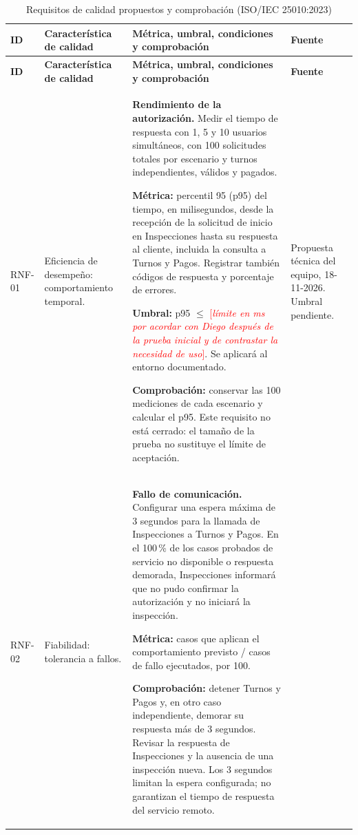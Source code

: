 \documentclass[11pt,a4paper]{article}
\newcommand{\pendiente}[1]{\textcolor{red}{[\textit{#1}]}}
\begin{document}
\begin{xltabular}{\textwidth}{lL{3.6cm}XL{2cm}}
  \caption{Requisitos de calidad propuestos y comprobación (ISO/IEC 25010:2023)}\label{tab:rnf}\\
  \toprule
  \textbf{ID} & \textbf{Característica de calidad} & \textbf{Métrica, umbral, condiciones y comprobación} & \textbf{Fuente} \\
  \midrule
  \endfirsthead
  \toprule
  \textbf{ID} & \textbf{Característica de calidad} & \textbf{Métrica, umbral, condiciones y comprobación} & \textbf{Fuente} \\
  \midrule
  \endhead
  \bottomrule
  \endfoot
  RNF-01 & Eficiencia de desempeño: comportamiento temporal. &
  \textbf{Rendimiento de la autorización.} Medir el tiempo de respuesta con 1, 5 y 10 usuarios simultáneos, con 100 solicitudes totales por escenario y turnos independientes, válidos y pagados.\par
  \textbf{Métrica:} percentil 95 (p95) del tiempo, en milisegundos, desde la recepción de la solicitud de inicio en Inspecciones hasta su respuesta al cliente, incluida la consulta a Turnos y Pagos. Registrar también códigos de respuesta y porcentaje de errores.\par
  \textbf{Umbral:} p95 $\leq$ \pendiente{límite en ms por acordar con Diego después de la prueba inicial y de contrastar la necesidad de uso}. Se aplicará al entorno documentado.\par
  \textbf{Comprobación:} conservar las 100 mediciones de cada escenario y calcular el p95. Este requisito no está cerrado: el tamaño de la prueba no sustituye el límite de aceptación. &
  Propuesta técnica del equipo, 18-11-2026. Umbral pendiente. \\
  RNF-02 & Fiabilidad: tolerancia a fallos. &
  \textbf{Fallo de comunicación.} Configurar una espera máxima de 3 segundos para la llamada de Inspecciones a Turnos y Pagos. En el 100\,\% de los casos probados de servicio no disponible o respuesta demorada, Inspecciones informará que no pudo confirmar la autorización y no iniciará la inspección.\par
  \textbf{Métrica:} casos que aplican el comportamiento previsto / casos de fallo ejecutados, por 100.\par
  \textbf{Comprobación:} detener Turnos y Pagos y, en otro caso independiente, demorar su respuesta más de 3 segundos. Revisar la respuesta de Inspecciones y la ausencia de una inspección nueva. Los 3 segundos limitan la espera configurada; no garantizan el tiempo de respuesta del servicio remoto. &

\end{xltabular}
\end{document}
